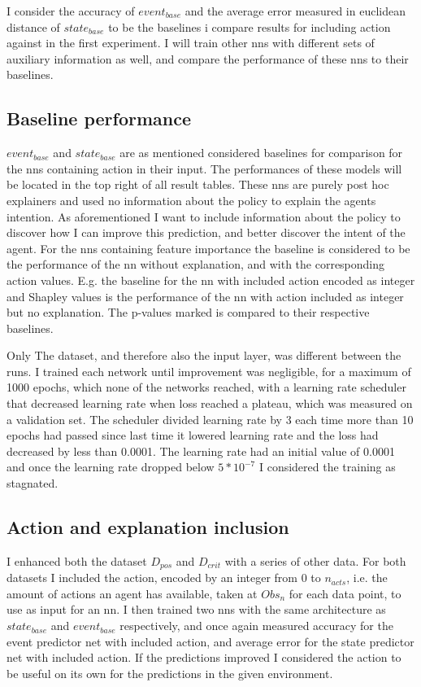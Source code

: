 \documentclass[UKenglish]{uiomasterthesis}
\begin{document}
I consider the accuracy of $event_{base}$ and the average error measured in euclidean distance of $state_{base}$ to be the baselines i compare results for including action against in the first experiment. I will train other \acp{nn} with different sets of auxiliary information as well, and compare the performance of these \acp{nn} to their baselines.


\subsection{Baseline performance}
$event_{base}$ and $state_{base}$ are as mentioned considered baselines for comparison for the \acp{nn} containing action in their input. The performances of these models will be located in the top right of all result tables. These \acp{nn} are purely post hoc explainers and used no information about the policy to explain the agents intention. As aforementioned I want to include information about the policy to discover how I can improve this prediction, and better discover the intent of the agent. For the \acp{nn} containing feature importance the baseline is considered to be the performance of the \ac{nn} without explanation, and with the corresponding action values. E.g. the baseline for the \ac{nn} with included action encoded as integer and Shapley values is the performance of the \ac{nn} with action included as integer but no explanation. The p-values marked is compared to their respective baselines.

Only The dataset, and therefore also the input layer, was different between the runs. I trained each network until improvement was negligible, for a maximum of 1000 epochs, which none of the networks reached, with a learning rate scheduler that decreased learning rate when loss reached a plateau, which was measured on a validation set. The scheduler divided learning rate by 3 each time more than 10 epochs had passed since last time it lowered learning rate and the loss had decreased by less than 0.0001. The learning rate had an initial value of 0.0001 and once the learning rate dropped below $5*10^{-7}$ I considered the training as stagnated.

\subsection{Action and explanation inclusion}
I enhanced both the dataset $D_{pos}$ and $D_{crit}$ with a series of other data. For both datasets I included the action, encoded by an integer from $0$ to $n_{acts}$, i.e. the amount of actions an agent has available, taken at $Obs_n$ for each data point, to use as input for an \ac{nn}. I then trained two \acp{nn} with the same architecture as $state_{base}$ and $event_{base}$ respectively, and once again measured accuracy for the event predictor net with included action, and average error for the state predictor net with included action. If the predictions improved I considered the action to be useful on its own for the predictions in the given environment.
\end{document}
